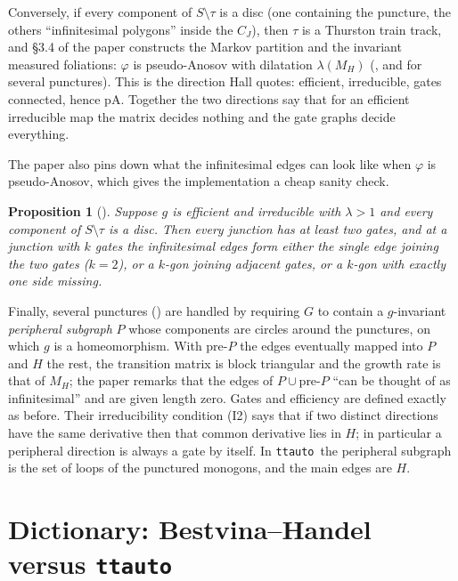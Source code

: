 \documentclass[12pt]{amsart}
\newcommand{\ho}{\varphi}                 %
\newcommand{\trk}{\tau}                   %
\newcommand{\lam}{\lambda}
\newcommand{\ttauto}{\texttt{ttauto}}
\theoremstyle{plain}
\newtheorem{Proposition}[Theorem]{Proposition}
\theoremstyle{definition}
\begin{document}
Conversely, if every component of $S\setminus\trk$ is a disc (one
containing the puncture, the others ``infinitesimal polygons'' inside the
$C_J$), then $\trk$ is a Thurston train track, and \S3.4 of the paper
constructs the Markov partition and the invariant measured foliations:
$\ho$ is pseudo-Anosov with dilatation $\lam(M_H)$
(\cite[Thm.~3.1.4]{Bestvina1995}, and \cite[Thm.~4.1.4]{Bestvina1995} for
several punctures).  This is the direction Hall quotes: efficient,
irreducible, gates connected, hence pA.  Together the two directions say
that for an efficient irreducible map the matrix decides nothing and the
gate graphs decide everything.

The paper also pins down what the infinitesimal edges can look like when
$\ho$ is pseudo-Anosov, which gives the implementation a cheap sanity
check.

\begin{Proposition}[{\cite[Props.~3.3.3--3.3.4]{Bestvina1995}}]
  \label{prop:shape}
  Suppose $g$ is efficient and irreducible with $\lam>1$ and every
  component of $S\setminus\trk$ is a disc.  Then every junction has at
  least two gates, and at a junction with $k$ gates the infinitesimal edges
  form either the single edge joining the two gates ($k=2$), or a
  $k$-gon joining adjacent gates, or a $k$-gon with exactly one side
  missing.
\end{Proposition}

Finally, several punctures (\cite[\S4]{Bestvina1995}) are handled by
requiring $G$ to contain a $g$-invariant \emph{peripheral subgraph} $P$
whose components are circles around the punctures, on which $g$ is a
homeomorphism.  With $\text{pre-}P$ the edges eventually mapped into $P$
and $H$ the rest, the transition matrix is block triangular and the growth
rate is that of $M_H$; the paper remarks that the edges of
$P\cup\text{pre-}P$ ``can be thought of as infinitesimal'' and are given
length zero.  Gates and efficiency are defined exactly as before.  Their
irreducibility condition (I2) says that if two distinct directions have
the same derivative then that common derivative lies in $H$; in
particular a peripheral direction is always a gate by itself.  In
\ttauto\ the peripheral subgraph is the set of loops of the punctured
monogons, and the main edges are $H$.

\section{Dictionary: Bestvina--Handel versus \ttauto}
\label{sec:dictionary}
\end{document}
